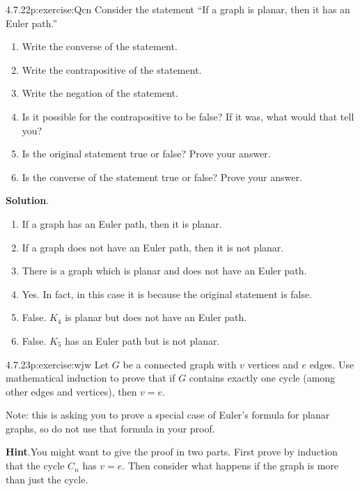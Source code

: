 \documentclass[twoside,11pt,]{book}
\newcommand{\blocktitlefont}{\relax}
\numberwithin{equation}{chapter}
\begin{document}
\begin{divisionsolution}{4.7.22}{}{p:exercise:Qcn}%
Consider the statement ``If a graph is planar, then it has an Euler path.''%
\begin{enumerate}[label=(\alph*)]
\item{}Write the converse of the statement.%
\item{}Write the contrapositive of the statement.%
\item{}Write the negation of the statement.%
\item{}Is it possible for the contrapositive to be false? If it was, what would that tell you?%
\item{}Is the original statement true or false? Prove your answer.%
\item{}Is the converse of the statement true or false? Prove your answer.%
\end{enumerate}
%
\par\smallskip%
\noindent\textbf{\blocktitlefont Solution}.\quad{}%
\begin{enumerate}[label=(\alph*)]
\item{}If a graph has an Euler path, then it is planar.%
\item{}If a graph does not have an Euler path, then it is not planar.%
\item{}There is a graph which is planar and does not have an Euler path.%
\item{}Yes. In fact, in this case it is because the original statement is false.%
\item{}False. \(K_4\) is planar but does not have an Euler path.%
\item{}False. \(K_5\) has an Euler path but is not planar.%
\end{enumerate}
%
\end{divisionsolution}%
\begin{divisionsolution}{4.7.23}{}{p:exercise:wjw}%
Let \(G\) be a connected graph with \(v\) vertices and \(e\) edges.  Use mathematical induction to prove that if \(G\) contains exactly one cycle (among other edges and vertices), then \(v = e\).%
\par
Note: this is asking you to prove a special case of Euler's formula for planar graphs, so do not use that formula in your proof.%
\par\smallskip%
\noindent\textbf{\blocktitlefont Hint}.\quad{}You might want to give the proof in two parts.  First prove by induction that the cycle \(C_n\) has \(v=e\).  Then consider what happens if the graph is more than just the cycle.%
\end{divisionsolution}%
\end{document}
